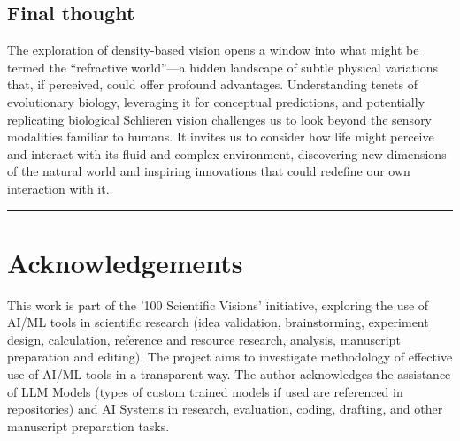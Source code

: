 \documentclass[11pt]{article}
\begin{document}
\subsection{Final thought}
The exploration of density-based vision opens a window into what might be termed the ``refractive world''---a hidden landscape of subtle physical variations that, if perceived, could offer profound advantages. Understanding tenets of evolutionary biology, leveraging it for conceptual predictions, and potentially replicating biological Schlieren vision challenges us to look beyond the sensory modalities familiar to humans. It invites us to consider how life might perceive and interact with its fluid and complex environment, discovering new dimensions of the natural world and inspiring innovations that could redefine our own interaction with it.

\bigskip\noindent\rule{\linewidth}{0.4pt}\bigskip

\newpage
\section*{Acknowledgements}
\label{sec:acknowledgements} %

This work is part of the '100 Scientific Visions' initiative, exploring the use of AI/ML tools in scientific research (idea validation, brainstorming, experiment design, calculation, reference and resource research, analysis, manuscript preparation and editing). The project aims to investigate methodology of effective use of AI/ML tools in a transparent way. The author acknowledges the assistance of LLM Models (types of custom trained models if used are referenced in repositories) and AI Systems in research, evaluation, coding, drafting, and other manuscript preparation tasks.





\end{document}
